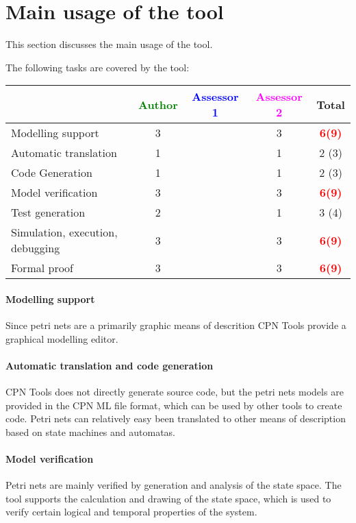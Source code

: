\section{Main usage of the tool}
\label{main_usage}

This section discusses the main usage of the tool.

The following tasks are covered by the tool:


\begin{tabular}{|l | c | c | c | c|}
\hline
& \textcolor{green}{Author} & \textcolor{blue}{Assessor 1} & \textcolor{magenta}{Assessor 2} & Total \\
\hline 
Modelling support & 3     & & 3     & \textcolor{red}{\textbf{6(9)}}   \\
\hline
Automatic translation  & 1     & & 1     & 2 (3) \\
\hline
Code Generation  & 1     & & 1     & 2 (3) \\
\hline
Model verification & 3     & & 3     & \textcolor{red}{\textbf{6(9)}}  \\
\hline
Test generation & 2     & & 1     & 3 (4) \\
\hline
Simulation, execution, debugging & 3     & & 3     & \textcolor{red}{\textbf{6(9)}}  \\
\hline
Formal proof & 3     & & 3     & \textcolor{red}{\textbf{6(9)}}  \\
\hline
\end{tabular}

\paragraph{Modelling support}
Since petri nets are a primarily graphic means of descrition CPN Tools provide a graphical modelling editor.

\paragraph{Automatic translation and code generation}
CPN Tools does not directly generate source code, but the petri nets models are provided in the CPN ML file format, which can be used by other tools to create code. Petri nets can relatively easy been translated to other means of description based on state machines and automatas. 

\paragraph{Model verification}
Petri nets are mainly verified by generation and analysis of the state space. The tool supports the calculation and drawing of the state space, which is used to verify certain logical and temporal properties of the system.

